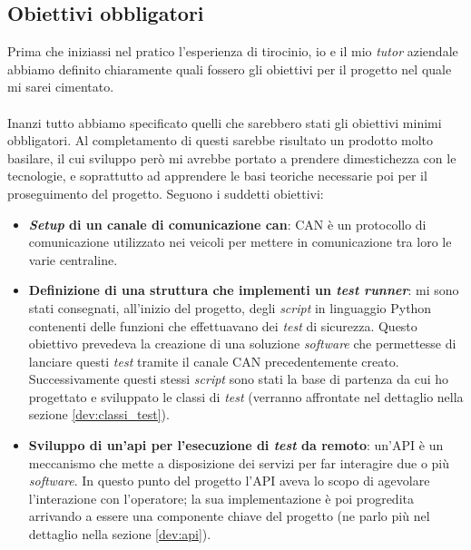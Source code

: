\subsection{Obiettivi obbligatori}
\noindent
Prima che iniziassi nel pratico l'esperienza di tirocinio, io e il mio \textit{tutor} aziendale abbiamo definito chiaramente quali fossero gli obiettivi per il progetto nel quale mi sarei cimentato.
\\\\
\noindent
Inanzi tutto abbiamo specificato quelli che sarebbero stati gli obiettivi minimi obbligatori.
Al completamento di questi sarebbe risultato un prodotto molto basilare, il cui sviluppo però mi avrebbe portato a prendere dimestichezza con le tecnologie, e soprattutto ad apprendere le basi teoriche necessarie poi per il proseguimento del progetto.
Seguono i suddetti obiettivi:
\begin{itemize}
    \itemsep0em
	\item \textbf{\textit{Setup} di un canale di comunicazione \gls{can}}:
	CAN è un protocollo di comunicazione utilizzato nei veicoli per mettere in comunicazione tra loro le varie centraline.

	\item \textbf{Definizione di una struttura che implementi un \textit{test runner}}:
	mi sono stati consegnati, all'inizio del progetto, degli \textit{script} in linguaggio Python contenenti delle funzioni che effettuavano dei \textit{test} di sicurezza.
	Questo obiettivo prevedeva la creazione di una soluzione \textit{software} che permettesse di lanciare questi \textit{test} tramite il canale CAN precedentemente creato.
    Successivamente questi stessi \textit{script} sono stati la base di partenza da cui ho progettato e sviluppato le classi di \textit{test} (verranno affrontate nel dettaglio nella sezione \ref{dev:classi_test}).

    \item \textbf{Sviluppo di un'\gls{api} per l’esecuzione di \textit{test} da remoto}:
    un'API è un meccanismo che mette a disposizione dei servizi per far interagire due o più \textit{software}.
    In questo punto del progetto l'API aveva lo scopo di agevolare l'interazione con l'operatore; la sua implementazione è poi progredita arrivando a essere una componente chiave del progetto (ne parlo più nel dettaglio nella sezione \ref{dev:api}).
\end{itemize}



